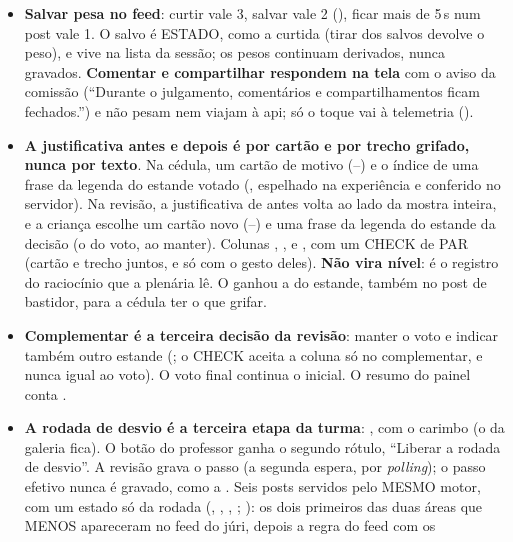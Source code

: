 \begin{itemize}
  \item \textbf{Salvar pesa no feed}: curtir vale 3, salvar vale 2
    (), ficar mais de 5\,s num post vale 1. O salvo é
    ESTADO, como a curtida (tirar dos salvos devolve o peso), e vive na lista
     da sessão; os pesos continuam derivados, nunca gravados.
    \textbf{Comentar e compartilhar respondem na tela} com o aviso da comissão
    (\enquote{Durante o julgamento, comentários e compartilhamentos ficam
    fechados.}) e não pesam nem viajam à api; só o toque vai à telemetria
    ().
  \item \textbf{A justificativa antes e depois é por cartão e por trecho
    grifado, nunca por texto}. Na cédula, um cartão de motivo (--)
    e o índice de uma frase da legenda do estande votado
    (, espelhado na
    experiência e conferido no servidor). Na revisão, a justificativa de antes
    volta ao lado da mostra inteira, e a criança escolhe um cartão novo
    (--) e uma frase da legenda do estande da decisão (o do voto,
    ao manter). Colunas , ,
     e , com um CHECK de PAR (cartão e
    trecho juntos, e só com o gesto deles). \textbf{Não vira nível}: é o
    registro do raciocínio que a plenária lê. O  ganhou a
     do estande, também no post de bastidor, para a cédula ter o
    que grifar.
  \item \textbf{Complementar é a terceira decisão da revisão}: manter o voto e
    indicar também outro estande (; o CHECK aceita a
    coluna só no complementar, e nunca igual ao voto). O voto final continua o
    inicial. O resumo do painel conta .
  \item \textbf{A rodada de desvio é a terceira etapa da turma}:
     \seta{}  \seta{} , com o carimbo
     (o da galeria fica). O botão do professor ganha
    o segundo rótulo, \enquote{Liberar a rodada de desvio}. A revisão grava o
    passo  (a segunda espera, por \emph{polling}); o passo
    efetivo  nunca é gravado, como a . Seis posts
    servidos pelo MESMO motor, com um estado só da rodada
    (, , ,
    ; ): os dois primeiros das duas
    áreas que MENOS apareceram no feed do júri, depois a regra do feed com os

\end{itemize}
